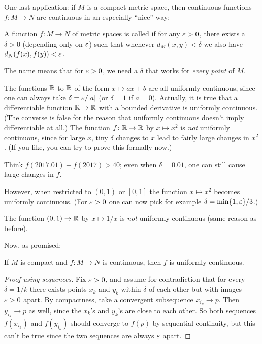 One last application: if $M$ is a compact metric space,
then continuous functions $f \colon M \to N$
are continuous in an especially ``nice'' way:
\begin{definition}
	A function $f \colon M \to N$ of metric spaces
	is called 
	if for any $\varepsilon > 0$, there exists a $\delta > 0$
	(depending only on $\varepsilon$) such that
	whenever $d_M(x,y) < \delta$ we also have $d_N(f(x), f(y)) < \varepsilon$.
\end{definition}
The name means that for $\varepsilon > 0$,
we need a $\delta$ that works for \emph{every point} of $M$.
\begin{example}
	\listhack
	\begin{enumerate}[(a)]
		\ii The functions $\mathbb R$ to $\mathbb R$ of the form
		$x \mapsto ax+b$ are all uniformly continuous,
		since one can always take $\delta = \varepsilon/|a|$ (or $\delta=1$ if $a=0$).
		\ii Actually, it is true that a differentiable function $\mathbb R \to \mathbb R$
		with a bounded derivative is uniformly continuous.
		(The converse is false for the reason that uniformly continuous
		doesn't imply differentiable at all.)
		\ii The function $f \colon \mathbb R \to \mathbb R$ by $x \mapsto x^2$
		is \emph{not} uniformly continuous, since for large $x$,
		tiny $\delta$ changes to $x$ lead to fairly large changes in $x^2$.
		(If you like, you can try to prove this formally now.)

		Think $f(2017.01) - f(2017) > 40$;
		even when $\delta = 0.01$, one can still cause large changes in $f$.

		\ii However, when restricted to $(0,1)$ or $[0,1]$
		the function $x \mapsto x^2$ becomes uniformly continuous.
		(For $\varepsilon > 0$ one can now pick for example $\delta = \min\{1,\varepsilon\}/3$.)

		\ii The function $(0,1) \to \mathbb R$ by $x \mapsto 1/x$ is \emph{not}
		uniformly continuous (same reason as before).
	\end{enumerate}
\end{example}

Now, as promised:
\begin{proposition}
	If $M$ is compact and $f \colon M \to N$ is continuous,
	then $f$ is uniformly continuous.
\end{proposition}
\begin{proof}[Proof using sequences]
	Fix $\varepsilon > 0$, and assume for contradiction that for every $\delta = 1/k$
	there exists points $x_k$ and $y_k$ within $\delta$ of each
	other but with images $\varepsilon > 0$ apart.
	By compactness, take a convergent subsequence $x_{i_k} \to p$.
	Then $y_{i_k} \to p$ as well, since the $x_k$'s and $y_k$'s are close to each other.
	So both sequences $f(x_{i_k})$ and $f(y_{i_k})$ should converge to $f(p)$ by sequential continuity,
	but this can't be true since the two sequences are always $\varepsilon$ apart.
\end{proof}

